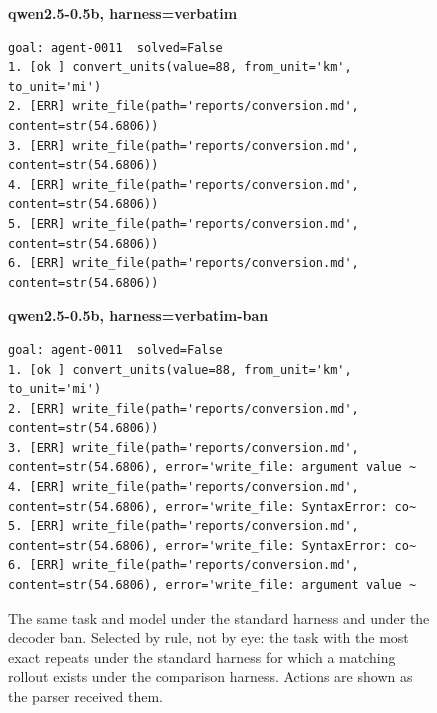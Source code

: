 \begin{figure}[t]
\centering
\begin{minipage}{\textwidth}
\textbf{qwen2.5-0.5b, harness=verbatim}
{\verbfont\begin{verbatim}
goal: agent-0011  solved=False
1. [ok ] convert_units(value=88, from_unit='km', to_unit='mi')
2. [ERR] write_file(path='reports/conversion.md', content=str(54.6806))
3. [ERR] write_file(path='reports/conversion.md', content=str(54.6806))
4. [ERR] write_file(path='reports/conversion.md', content=str(54.6806))
5. [ERR] write_file(path='reports/conversion.md', content=str(54.6806))
6. [ERR] write_file(path='reports/conversion.md', content=str(54.6806))
\end{verbatim}}

\textbf{qwen2.5-0.5b, harness=verbatim-ban}
{\verbfont\begin{verbatim}
goal: agent-0011  solved=False
1. [ok ] convert_units(value=88, from_unit='km', to_unit='mi')
2. [ERR] write_file(path='reports/conversion.md', content=str(54.6806))
3. [ERR] write_file(path='reports/conversion.md', content=str(54.6806), error='write_file: argument value ~
4. [ERR] write_file(path='reports/conversion.md', content=str(54.6806), error='write_file: SyntaxError: co~
5. [ERR] write_file(path='reports/conversion.md', content=str(54.6806), error='write_file: SyntaxError: co~
6. [ERR] write_file(path='reports/conversion.md', content=str(54.6806), error='write_file: argument value ~
\end{verbatim}}
\end{minipage}
\caption{The same task and model under the standard harness and under the decoder ban. Selected by rule, not by eye: the task with the most exact repeats under the standard harness for which a matching rollout exists under the comparison harness. Actions are shown as the parser received them.}
\label{fig:qualitative-ban}
\end{figure}
